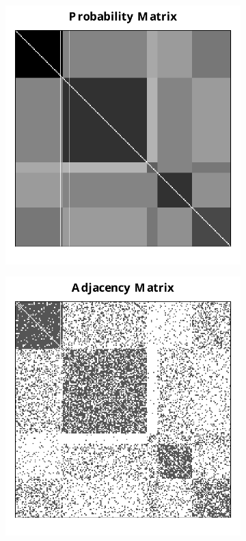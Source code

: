 \documentclass[a4paper]{article}
\begin{document}
\begin{figure}
\centering
\begin{subfigure}{.5\textwidth}
  \centering
  \includegraphics[width=\linewidth]{SBM_P.pdf}
\end{subfigure}%
\begin{subfigure}{.5\textwidth}
  \centering
  \includegraphics[width=\linewidth]{SBM_A.pdf}

\end{subfigure}
\end{figure}
\end{document}
